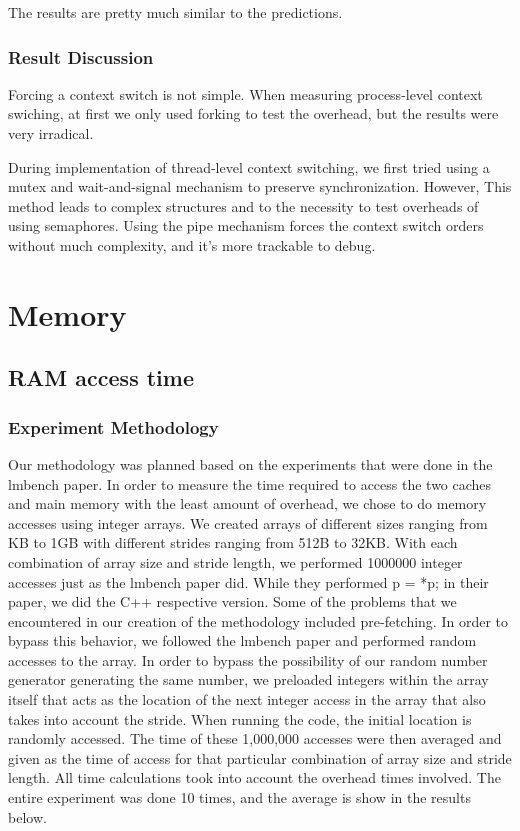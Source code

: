 \documentclass{article} %
\begin{document}
The results are pretty much similar to the predictions.

\subsubsection{Result Discussion}

Forcing a context switch is not simple. When measuring process-level context
swiching, at first we only used forking to test the overhead, but the results
were very irradical.

During implementation of thread-level context switching, we first tried using
a mutex and wait-and-signal mechanism to preserve synchronization. However,
This method leads to complex structures and to the necessity to test overheads
of using semaphores.  Using the pipe mechanism forces the context switch
orders without much complexity, and it's more trackable to debug.



\section{Memory}
\subsection{RAM access time}
\subsubsection{Experiment Methodology}
Our methodology was planned based on the experiments that were done in
the lmbench paper. In order to measure the time required to access the
two caches and main memory with the least amount of overhead, we chose to
do memory accesses using integer arrays. We created arrays of different
sizes ranging from KB to 1GB with different strides ranging from 512B to
32KB\@. With each combination of array size and stride length, we performed
1000000 integer accesses just as the lmbench paper did. While they performed
p = *p; in their paper, we did the C++ respective version. Some of the
problems that we encountered in our creation of the methodology included
pre-fetching. In order to bypass this behavior, we followed the lmbench
paper and performed random accesses to the array. In order to bypass the
possibility of our random number generator generating the same number, we
preloaded integers within the array itself that acts as the location of the
next integer access in the array that also takes into account the stride.
When running the code, the initial location is randomly accessed. The time
of these 1,000,000 accesses were then averaged and given as the time of
access for that particular combination of array size and stride length. All
time calculations took into account the overhead times involved. The entire
experiment was done 10 times, and the average is show in the results below.
\end{document}
